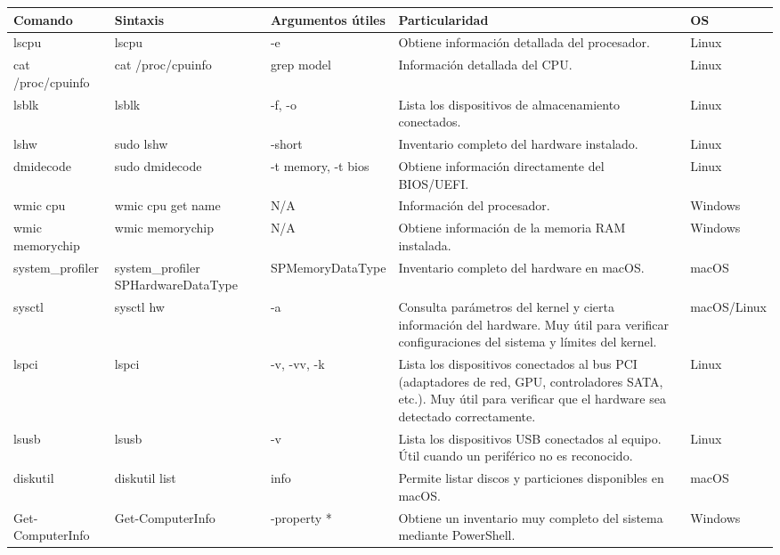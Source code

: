 \documentclass[a4paper,10pt]{article}
\begin{document}
\begin{longtable}{|p{2.8cm}|p{3.1cm}|p{4.3cm}|p{5.5cm}|p{1.5cm}|}

\hline
Comando &
Sintaxis &
Argumentos útiles &
Particularidad &
OS
\\
\hline
\endhead

lscpu &
lscpu &
-e &
Obtiene información detallada del procesador. &
Linux
\\
\hline

cat /proc/cpuinfo &
cat /proc/cpuinfo &
grep model &
Información detallada del CPU. &
Linux
\\
\hline

lsblk &
lsblk &
-f, -o &
Lista los dispositivos de almacenamiento conectados. &
Linux
\\
\hline

lshw &
sudo lshw &
-short &
Inventario completo del hardware instalado. &
Linux
\\
\hline

dmidecode &
sudo dmidecode &
-t memory, -t bios &
Obtiene información directamente del BIOS/UEFI. &
Linux
\\
\hline

wmic cpu &
wmic cpu get name &
N/A &
Información del procesador. &
Windows
\\
\hline

wmic memorychip &
wmic memorychip &
N/A &
Obtiene información de la memoria RAM instalada. &
Windows
\\
\hline

system\_profiler &
system\_profiler SPHardwareDataType &
SPMemoryDataType &
Inventario completo del hardware en macOS. &
macOS
\\
\hline



sysctl &
sysctl hw &
-a &
Consulta parámetros del kernel y cierta información del hardware. Muy útil para verificar configuraciones del sistema y límites del kernel. &
macOS/Linux
\\
\hline

lspci &
lspci &
-v, -vv, -k &
Lista los dispositivos conectados al bus PCI (adaptadores de red, GPU, controladores SATA, etc.). Muy útil para verificar que el hardware sea detectado correctamente. &
Linux
\\
\hline

lsusb &
lsusb &
-v &
Lista los dispositivos USB conectados al equipo. Útil cuando un periférico no es reconocido. &
Linux
\\
\hline

diskutil &
diskutil list &
info &
Permite listar discos y particiones disponibles en macOS. &
macOS
\\
\hline

Get-ComputerInfo &
Get-ComputerInfo &
-property * &
Obtiene un inventario muy completo del sistema mediante PowerShell. &
Windows
\\
\hline

\end{longtable}
\end{document}
